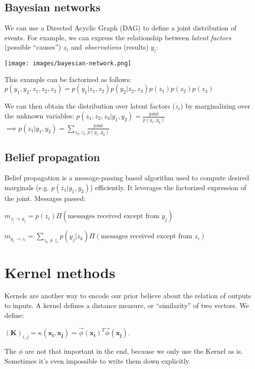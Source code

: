 \documentclass[10pt,a4paper,landscape]{article}
\renewcommand{\bf}[1]{\ensuremath{\mathbf{#1}}}
\begin{document}
\begin{multicols*}{4}
\subsection{Bayesian networks}
We can use a Directed Acyclic Graph (DAG) to define a joint distribution of events. For example, we can express the relationship between \textit{latent factors} (possible ``causes'') $z_i$ and \textit{observations} (results) $y_i$:

\begin{colfig}
  \centering
  \texttt{[image: images/bayesian-network.png]}
\end{colfig}

This example can be factorized as follows:
$p(y_1, y_2, z_1, z_2, z_3) = p(y_1 | z_1, z_2) p(y_2 | z_2, z_3) p(z_1) p(z_2) p(z_3)$

We can then obtain the distribution over latent factors ($z_i$) by marginalizing over the unknown variables:
$p(z_1, z_2, z_3 | y_1, y_2) = \frac{\text{joint}}{p(y_1, y_2)}$\\
$\implies p(z_1 | y_1, y_2) = \sum_{z_2, z_3} \frac{\text{joint}}{p(y_1, y_2)}$

\subsection{Belief propagation}
Belief propagation is a message-passing based algorithm used to compute desired marginals (e.g. $p(z_1 | y_1, y_2)$) efficiently. It leverages the factorized expression of the joint. Messages passed:

$m_{z_i \rightarrow y_j} = p(z_i) \Pi(\text{messages received except from } y_j)$

$m_{y_j \rightarrow z_i} = \sum_{z_k \neq z_i} p(y_j | z_k) \Pi(\text{messages received except from } z_i)$

\section{Kernel methods}
Kernels are another way to encode our prior believe about the relation of outputs to inputs. A kernel defines a distance measure, or ``similarity'' of two vectors. We define:

$(\bf{K})_{i,j} = \kappa(\bf{x_i}, \bf{x_j}) = \vec \phi(\bf{x_i})^T \vec \phi(\bf{x_j})$.

The $\phi$ are not that important in the end, because we only use the Kernel as is. Sometimes it's even impossible to write them down explicitly.


\end{multicols*}
\end{document}
